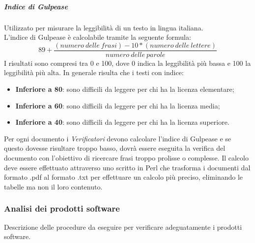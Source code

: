 \subparagraph{Indice di Gulpease}\Spazio
Utilizzato per misurare la leggibilità di un testo in lingua italiana.\\
L'indice di Gulpease è calcolabile tramite la seguente formula:
$$
89+\frac{(numero\:delle\:frasi)-10*(numero\:delle\:lettere)}{numero\:delle\:parole}
$$
I risultati sono compresi tra 0 e 100, dove 0 indica la leggibilità più bassa e 100 la leggibilità più alta. In generale risulta che i testi con indice:
\begin{itemize}
	\item{\textbf{Inferiore	a 80}}: sono difficili da leggere per chi ha la licenza elementare;
	\item{\textbf{Inferiore	a 60}}: sono difficili da leggere per chi ha la licenza media;
	\item{\textbf{Inferiore	a 40}}: sono difficili da leggere per chi ha la licenza superiore.
\end{itemize}
Per ogni documento i \emph{Verificatori} devono calcolare l'indice di Gulpease e se questo dovesse risultare troppo basso, dovrà essere eseguita la verifica del documento con l'obiettivo di ricercare frasi troppo prolisse o complesse. Il calcolo deve essere effettuato attraverso uno  scritto in Perl che trasforma i documenti dal formato .pdf al formato .txt per effettuare un calcolo più preciso, eliminando le tabelle ma non il loro contenuto.


\subsubsection{Analisi dei prodotti software}
Descrizione delle procedure da eseguire per verificare adeguatamente i prodotti software.
